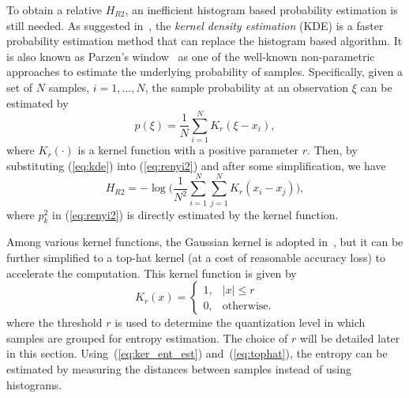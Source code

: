 \documentclass[12pt, draftclsnofoot, onecolumn]{IEEEtran}
\begin{document}
To obtain a relative \(H_{R2 }\), an inefficient histogram based probability estimation is still needed.
As suggested in~\cite{Principe2000a}, the \textit{kernel density estimation} (KDE) is a faster probability estimation method that can replace the histogram based algorithm.
It is also known as Parzen's window~\cite{Parzen1962} as one of the well-known non-parametric approaches to estimate the underlying probability of samples. 
% 
% 
Specifically, given a set of \(N\) samples, \(i=1, \dots, N\), the sample probability at an observation \(\xi\) can be estimated by
\begin{equation}
{ p(\xi)={\frac {1}{N}}\sum _{i=1}^{N}K_{r}\left(\xi-x_i\right)},
\label{eq:kde}
\end{equation}
where $K_r(\cdot)$ is a kernel function with a positive parameter $r$.
Then, by substituting (\ref{eq:kde}) into (\ref{eq:renyi2}) and after some simplification, we have
\begin{equation}
H_{R2 }=-\log {\Bigg (}\frac{1}{N^2}\sum _{i=1}^{N}\sum _{j=1}^{N}K_{r}\left(x_i-x_j\right){\Bigg )},
\label{eq:ker_ent_est}
\end{equation}
where \(p_k^2\) in (\ref{eq:renyi2}) is directly estimated by the kernel function.

Among various kernel functions, the Gaussian kernel is adopted in~\cite{Principe2000a}, but it can be further simplified to a top-hat kernel (at a cost of reasonable accuracy loss) to accelerate the computation. 
This kernel function is given by
\begin{equation}
{\displaystyle K_{r}(x)={\begin{cases}1,&|x|\leq r\\0,&{\mbox{otherwise.}}\end{cases}}}
\label{eq:tophat}
\end{equation}
where the threshold \(r\) is used to determine the quantization level in which samples are grouped for entropy estimation.
The choice of \(r\) will be detailed later in this section.
% 
% 
Using~(\ref{eq:ker_ent_est}) and~(\ref{eq:tophat}), the entropy can be estimated by  measuring the distances between samples instead of using histograms.
\end{document}
